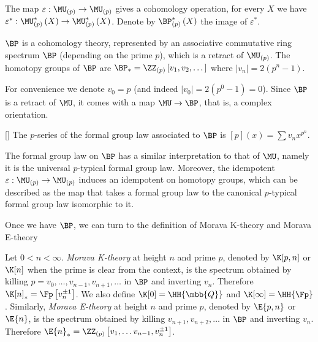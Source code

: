 The map $\varepsilon: \MU_{\left(p\right)} \to \MU_{\left(p\right)}$ gives a cohomology operation, for every $X$ we have $\varepsilon^*: \MU_{\left(p\right)}^*\left(X\right) \to \MU_{\left(p\right)}^*\left(X\right)$.
Denote by $\BP_{\left(p\right)}^*\left(X\right)$ the image of $\varepsilon^*$.

\begin{theorem}
	$\BP$ is a cohomology theory, represented by an associative commutative ring spectrum $\BP$ (depending on the prime $p$), which is a retract of $\MU_{\left(p\right)}$.
	The homotopy groups of $\BP$ are $\BP_* = \ZZ_{\left(p\right)}\left[v_1, v_2, \dotsc\right]$ where $\left|v_n\right| = 2\left(p^n-1\right)$.
\end{theorem}

For convenience we denote $v_0 = p$ (and indeed $\left|v_0\right| = 2\left(p^0-1\right) = 0$).
Since $\BP$ is a retract of $\MU$, it comes with a map $\MU \to \BP$, that is, a complex orientation.

\begin{proposition}\label{bp-p-series}[]
	The $p$-series of the formal group law associated to $\BP$ is
	$\left[p\right]\left(x\right) = \sum v_n x^{p^n}$.
\end{proposition}

\begin{remark}
	The formal group law on $\BP$ has a similar interpretation to that of $\MU$, namely it is the universal $p$-typical formal group law.
	Moreover, the idempotent $\varepsilon: \MU_{\left(p\right)} \to \MU_{\left(p\right)}$ induces an idempotent on homotopy groups, which can be described as the map that takes a formal group law to the canonical $p$-typical formal group law isomorphic to it.
\end{remark}

Once we have $\BP$, we can turn to the definition of Morava K-theory and Morava E-theory

\begin{definition}
	Let $0 < n < \infty$.
	\emph{Morava K-theory} at height $n$ and prime $p$, denoted by $\K[p,n]$ or $\K[n]$ when the prime is clear from the context, is the spectrum obtained by killing $p=v_0, \dotsc, v_{n-1}, v_{n+1}, \dotsc$ in $\BP$ and inverting $v_n$.
	Therefore $\K[n]_* = \Fp\left[v_n^{\pm 1}\right]$.
	We also define $\K[0] = \HH{\mbb{Q}}$ and $\K[\infty] = \HH{\Fp}$.
	Similarly, \emph{Morava E-theory} at height $n$ and prime $p$, denoted by $\E{p,n}$ or $\E{n}$, is the spectrum obtained by killing $v_{n+1}, v_{n+2}, \dotsc$ in $\BP$ and inverting $v_n$.
	Therefore $\E{n}_* = \ZZ_{\left(p\right)}\left[v_1, \dotsc v_{n-1}, v_n^{\pm 1}\right]$.
\end{definition}

